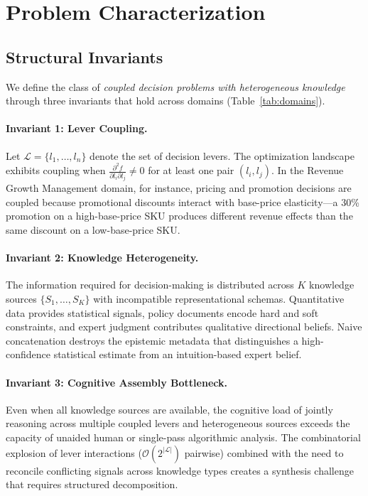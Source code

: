 \section{Problem Characterization}
\label{sec:problem}

\subsection{Structural Invariants}

We define the class of \emph{coupled decision problems with heterogeneous knowledge} through three invariants that hold across domains (Table~\ref{tab:domains}).

\paragraph{Invariant 1: Lever Coupling.}
Let $\mathcal{L} = \{l_1, \ldots, l_n\}$ denote the set of decision levers.
The optimization landscape exhibits coupling when $\frac{\partial^2 f}{\partial l_i \partial l_j} \neq 0$ for at least one pair $(l_i, l_j)$.
In the Revenue Growth Management domain, for instance, pricing and promotion decisions are coupled because promotional discounts interact with base-price elasticity---a 30\% promotion on a high-base-price SKU produces different revenue effects than the same discount on a low-base-price SKU.

\paragraph{Invariant 2: Knowledge Heterogeneity.}
The information required for decision-making is distributed across $K$ knowledge sources $\{S_1, \ldots, S_K\}$ with incompatible representational schemas.
Quantitative data provides statistical signals, policy documents encode hard and soft constraints, and expert judgment contributes qualitative directional beliefs.
Naive concatenation destroys the epistemic metadata that distinguishes a high-confidence statistical estimate from an intuition-based expert belief.

\paragraph{Invariant 3: Cognitive Assembly Bottleneck.}
Even when all knowledge sources are available, the cognitive load of jointly reasoning across multiple coupled levers and heterogeneous sources exceeds the capacity of unaided human or single-pass algorithmic analysis.
The combinatorial explosion of lever interactions ($\mathcal{O}(2^{|\mathcal{L}|})$ pairwise) combined with the need to reconcile conflicting signals across knowledge types creates a synthesis challenge that requires structured decomposition.

